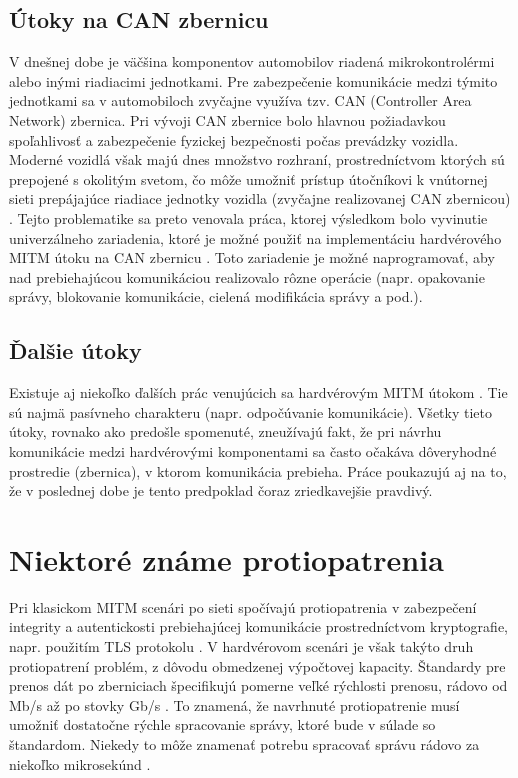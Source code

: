 \subsection{Útoky na CAN zbernicu}
V dnešnej dobe je väčšina komponentov automobilov riadená mikrokontrolérmi alebo inými riadiacimi jednotkami. Pre zabezpečenie komunikácie medzi týmito jednotkami sa v automobiloch zvyčajne využíva tzv. CAN (Controller Area Network) zbernica. Pri vývoji CAN zbernice bolo hlavnou požiadavkou spoľahlivosť a zabezpečenie fyzickej bezpečnosti počas prevádzky vozidla. Moderné vozidlá však majú dnes množstvo rozhraní, prostredníctvom ktorých sú prepojené s okolitým svetom, čo môže umožniť prístup útočníkovi k vnútornej sieti prepájajúce riadiace jednotky vozidla (zvyčajne realizovanej CAN zbernicou) \cite{mitmCAN}.
Tejto problematike sa preto venovala práca, ktorej výsledkom bolo vyvinutie univerzálneho zariadenia, ktoré je možné použiť na implementáciu hardvérového MITM útoku na CAN zbernicu \cite{mitmCAN}. Toto zariadenie je možné naprogramovať, aby nad prebiehajúcou komunikáciou realizovalo rôzne operácie (napr. opakovanie správy, blokovanie komunikácie, cielená modifikácia správy a pod.).

\subsection{Ďalšie útoky}
Existuje aj niekoľko ďalších prác venujúcich sa hardvérovým MITM útokom \cite{mitmI2C, mitmSPI}. Tie sú najmä pasívneho charakteru (napr. odpočúvanie komunikácie). Všetky tieto útoky, rovnako ako predošle spomenuté, zneužívajú fakt, že pri návrhu komunikácie medzi hardvérovými komponentami sa často očakáva dôveryhodné prostredie (zbernica), v ktorom komunikácia prebieha. Práce poukazujú aj na to, že v poslednej dobe je tento predpoklad čoraz zriedkavejšie pravdivý.

\section{Niektoré známe protiopatrenia} \label{kap1:sek:protiopatrenia}
Pri klasickom MITM scenári po sieti spočívajú protiopatrenia v zabezpečení integrity a autentickosti prebiehajúcej komunikácie prostredníctvom kryptografie, napr. použitím TLS protokolu \cite{mitmTheory}. V hardvérovom scenári je však takýto druh protiopatrení problém, z dôvodu obmedzenej výpočtovej kapacity. Štandardy pre prenos dát po zberniciach špecifikujú pomerne veľké rýchlosti prenosu, rádovo od Mb/s až po stovky Gb/s \cite{i2cBus, mitmPCIe}. To znamená, že navrhnuté protiopatrenie musí umožniť dostatočne rýchle spracovanie správy, ktoré bude v súlade so štandardom. Niekedy to môže znamenať potrebu spracovať správu rádovo za niekoľko mikrosekúnd \cite{mitmPCIe}.

